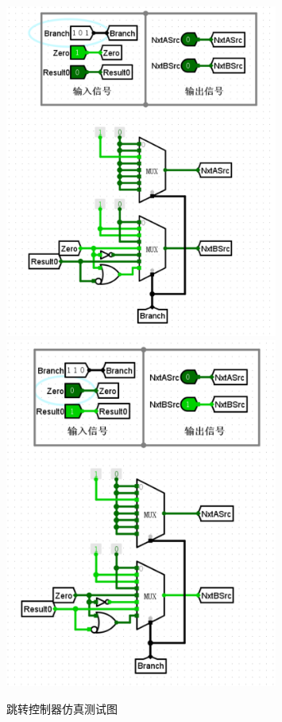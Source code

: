 \documentclass{article}
\begin{document}
    \begin{figure}[H]
        \centering
        \includegraphics[width=0.8\textwidth]{5.5.5.png}
        \includegraphics[width=0.8\textwidth]{5.5.6.png}    
        \caption{跳转控制器仿真测试图}
    \end{figure}
\end{document}
